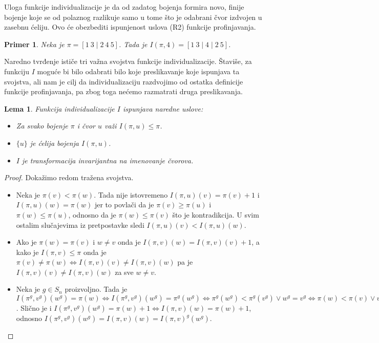 \documentclass[12pt,oneside]{memoir}
\newtheorem{lemma}{Lema}
\newtheorem{example}{Primer}
\theoremstyle{definition}
\begin{document}
  Uloga funkcije individualizacije je da od zadatog bojenja formira novo,
  finije bojenje koje se od polaznog razlikuje samo u tome što je odabrani čvor
  izdvojen u zasebnu ćeliju. Ovo će obezbediti ispunjenost uslova (R2) funkcije
  profinjavanja.

  \begin{example}
	  Neka je $\pi = [1\ 3 \mid 2\ 4\ 5]$. Tada je $I(\pi, 4) = [1\ 3 \mid 4
	  \mid 2\ 5]$.
  \end{example}

  Naredno tvrđenje ističe tri važna svojstva funkcije individualizacije.
  Štaviše, za funkciju $I$ moguće bi bilo odabrati bilo koje preslikavanje koje
  ispunjava ta svojstva, ali nam je cilj da individualizaciju razdvojimo od
  ostatka definicije funkcije profinjavanja, pa zbog toga nećemo razmatrati
  druga preslikavanja.
  
  \begin{lemma}
	  Funkcija individualizacije $I$ ispunjava naredne uslove:
	  \begin{itemize}
		  \item[(I1)] Za svako bojenje $\pi$ i čvor $u$ važi $I(\pi, u) \leq \pi$.
		  \item[(I2)] $\{u\}$ je ćelija bojenja $I(\pi, u)$.
		  \item[(I3)] $I$ je transformacija invarijantna na imenovanje čvorova.
	  \end{itemize}
  \end{lemma}
  
  \begin{proof}
	  Dokažimo redom tražena svojstva.
  \begin{itemize}
  \item[(I1)] Neka je $\pi(v) < \pi(w)$. Tada nije istovremeno $I(\pi,
	  u)(v) = \pi(v) + 1$ i $I(\pi, u)(w) = \pi(w)$ jer to povlači da je
	  $\pi(v) \geq \pi(u)$ i $\pi(w) \leq \pi(u)$, odnosno da je $\pi(w) \leq
	  \pi(v)$ što je kontradikcija. U svim ostalim slučajevima iz pretpostavke
	  sledi $I(\pi, u)(v) < I(\pi, u)(w)$.

  \item[(I2)] Ako je $\pi(w) = \pi(v)$ i $w \neq v$ onda je $I(\pi, v)(w) = I(\pi,
	  v)(v) + 1$, a kako je $I(\pi, v) \leq \pi$ onda je $\pi(v) \neq \pi(w)
	  \iff I(\pi, v)(v) \neq I(\pi, v)(w)$ pa je $I(\pi, v)(v) \neq I(\pi,
	  v)(w)$ za sve $w \neq v$.

  \item[(I3)] Neka je $g \in S_n$ proizvoljno. Tada je $I(\pi^g, v^g)(w^g) =
	  \pi(w) \iff I(\pi^g, v^g)(w^g) = \pi^g(w^g) \iff \pi^g(w^g) < \pi^g(v^g)
	  \lor w^g = v^g \iff \pi(w) < \pi(v) \lor w = v \iff I(\pi, v)(w) =
	  \pi(w)$. Slično je i $I(\pi^g, v^g)(w^g) = \pi(w) + 1 \iff I(\pi, v)(w) =
	  \pi(w) + 1$, odnosno $I(\pi^g, v^g)(w^g) = I(\pi, v)(w) = I(\pi,
	  v)^g(w^g)$.
  \end{itemize}
  \end{proof}
\end{document}
